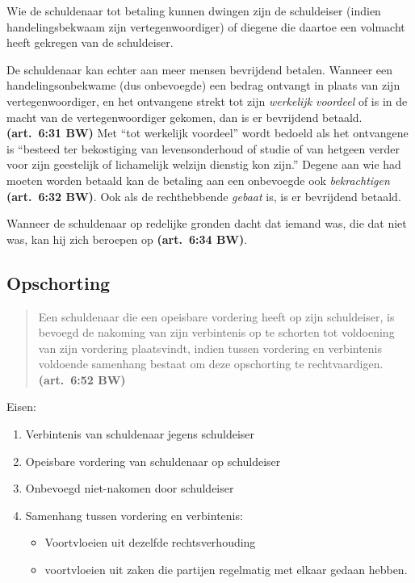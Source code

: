 \documentclass[a4paper]{article}
\newcommand{\art}[1]{\textbf{(art.~#1 BW)}\xspace}
\begin{document}
Wie de schuldenaar tot betaling kunnen dwingen zijn de schuldeiser (indien
handelingsbekwaam zijn vertegenwoordiger) of diegene die daartoe een volmacht
heeft gekregen van de schuldeiser.

De schuldenaar kan echter aan meer mensen bevrijdend betalen. Wanneer een
handelingsonbekwame (dus onbevoegde) een bedrag ontvangt in plaats van zijn
vertegenwoordiger, en het ontvangene strekt tot zijn \emph{werkelijk
voordeel} of is in de macht van de vertegenwoordiger gekomen, dan is er
bevrijdend betaald. \art{6:31} Met ``tot werkelijk voordeel'' wordt bedoeld
als het ontvangene is ``besteed ter bekostiging van levensonderhoud of studie
of van hetgeen verder voor zijn geestelijk of lichamelijk welzijn dienstig kon
zijn.'' Degene aan wie had moeten worden betaald kan de betaling aan een
onbevoegde ook \emph{bekrachtigen} \art{6:32}. Ook als de rechthebbende
\emph{gebaat} is, is er bevrijdend betaald.

Wanneer de schuldenaar op redelijke gronden dacht dat iemand was, die
dat niet was, kan hij zich beroepen op \art{6:34}.

\subsection{Opschorting}

\begin{quote}

  Een schuldenaar die een opeisbare vordering heeft op zijn schuldeiser, is
  bevoegd de nakoming van zijn verbintenis op te schorten tot voldoening van
  zijn vordering plaatsvindt, indien tussen vordering en verbintenis voldoende
  samenhang bestaat om deze opschorting te rechtvaardigen. \art{6:52}

\end{quote}

Eisen:
\begin{enumerate}
  \item Verbintenis van schuldenaar jegens schuldeiser
  \item Opeisbare vordering van schuldenaar op schuldeiser
  \item Onbevoegd niet-nakomen door schuldeiser
  \item Samenhang tussen vordering en verbintenis:
    \begin{itemize}
      \item Voortvloeien uit dezelfde rechtsverhouding
      \item voortvloeien uit zaken die partijen regelmatig met elkaar gedaan
        hebben.
    \end{itemize}
\end{enumerate}
\end{document}
